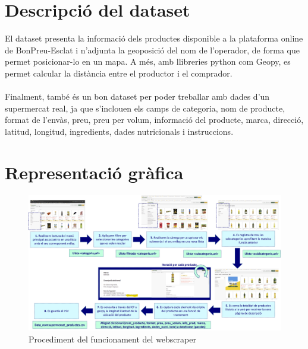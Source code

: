 \documentclass[]{scrartcl}
\begin{document}
\section{Descripció del dataset}
El dataset presenta la informació dels productes disponible a la plataforma online de BonPreu-Esclat i n'adjunta la geoposició del nom de l'operador, de forma que permet posicionar-lo en un mapa.
A més, amb llibreries python com Geopy, es permet calcular la distància entre el productor i el comprador.
\\\\Finalment, també és un bon dataset per poder treballar amb dades d'un supermercat real, ja que s'inclouen els camps de categoria, nom de producte, format de l'envàs, preu, preu per volum, informació del producte, marca, direcció, latitud, longitud, ingredients, dades nutricionals i instruccions.

\section{Representació gràfica}

\begin{figure}[htb]
	\centering
	\includegraphics{../img/infographic_productesProximitatScraper_procediment}
	\caption{Procediment del funcionament del webscraper}
\end{figure}
\end{document}
